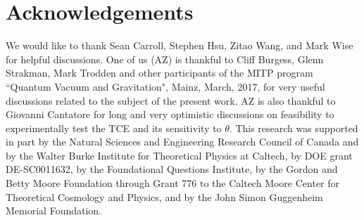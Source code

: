\documentclass[ twocolumn,aps,prd,   
               preprintnumbers,numbers,sort&compress,nofootinbib,
                            showpacs,superscriptaddress,
               colorlinks,
               linkcolor=blue,   
               citecolor=blue]{revtex4-1}   \newcommand{\exclude}[1]{}
\begin{document}
         

                   
 \section*{Acknowledgements} 
 
    We would like to thank Sean Carroll, Stephen Hsu, Zitao Wang, and Mark Wise for helpful discussions. 
    One of us (AZ) is thankful to Cliff Burgess, Glenn Strakman, Mark Trodden and other participants of  the MITP program ``Quantum Vacuum and Gravitation", Mainz,  March, 2017, 
    for very useful discussions related to the subject of the present work.   AZ is also thankful to Giovanni Cantatore for long and very optimistic  discussions on feasibility  to experimentally test the TCE and its sensitivity to $\theta$.  
    This research was supported in part by the Natural Sciences and Engineering Research Council of Canada and by the Walter Burke Institute for Theoretical Physics at Caltech, by DOE grant DE-SC0011632, by the Foundational Questions Institute, by the Gordon and Betty Moore Foundation through Grant 776 to the Caltech Moore Center for Theoretical Cosmology and Physics, and by the John Simon Guggenheim Memorial Foundation. 
    

 

\end{document}
